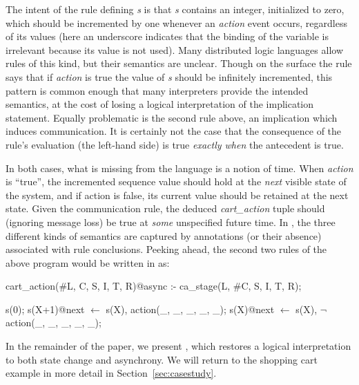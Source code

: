 The intent of the rule defining {\em s} is that \emph{s} contains an integer, initialized to
zero, which should be incremented by one whenever an {\em action} event occurs,
regardless of its values (here an underscore indicates that the binding of the variable
is irrelevant because its value is not used).  
Many distributed logic languages allow rules of this kind,
but their semantics are unclear.  Though on the surface the rule says that if {\em action} is true
the value of {\em s} should be infinitely incremented, this pattern is common enough
that many interpreters provide the intended semantics, at the cost of losing a logical
interpretation of the implication statement.  Equally problematic is the second rule above,
an implication which induces communication.  It is certainly not the case that the consequence of the rule's evaluation (the left-hand side) is true {\em exactly when} the antecedent is
true.  

In both cases, what is missing from the language is a notion of time.  When {\em action} is ``true'',
the incremented sequence value should
hold at the {\em next} visible state of the system, and if action is false, its current
value should be retained at the next state.  Given the communication rule, 
the deduced {\em cart\_action}
tuple should (ignoring message loss) be true at {\em some} unspecified future time.  In \lang,
the three different kinds of semantics are captured by annotations (or their absence) 
associated with rule conclusions.  Peeking ahead, the second two rules of the above program would be written in \lang as:

\begin{Dedalus}
cart_action(#L, C, S, I, T, R)@async :-
  ca_stage(L, #C, S, I, T, R);

s(0);
s(X+1)@next \(\leftarrow\)  s(X), action(_, _, _, _, _);
s(X)@next \(\leftarrow\)  s(X), \(\lnot\) action(_, _, _, _, _);
\end{Dedalus}

In the remainder of the paper, we present \lang, which restores a logical interpretation to
both state change and asynchrony.  We will return to the shopping cart example in more detail 
in Section~\ref{sec:casestudy}.

